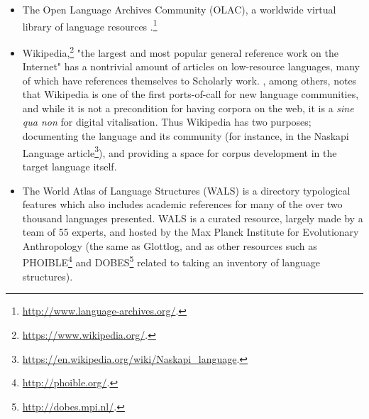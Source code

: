 \begin{itemize}
\item The Open Language Archives Community (OLAC), a worldwide virtual library of language resources \citep{simons2003open}.\footnote{\href{http://www.language-archives.org/}{http://www.language-archives.org/}. }

\item Wikipedia,\footnote{\href{https://www.wikipedia.org/}{https://www.wikipedia.org/}. } "the largest and most popular general reference work on the Internet" \citep{wiki:Wikipedia} has a nontrivial amount of articles on low-resource languages, many of which have references themselves to Scholarly work. \citet{kornai2013digital}, among others, notes that Wiki\-pedia is one of the first ports-of-call for new language communities, and while it is not a precondition for having corpora on the web, it is a {\it sine qua non} for digital vitalisation. Thus Wikipedia has two purposes; documenting the language and its community (for instance, in the Naskapi Language article\footnote{\href{https://en.wikipedia.org/wiki/Naskapi\_language}{https://en.wikipedia.org/wiki/Naskapi\_language}. }), and providing a space for corpus development in the target language itself.

\item The World Atlas of Language Structures (WALS) is a directory typological features which also includes academic references for many of the over two thousand languages presented. WALS is a curated resource, largely made by a team of 55 experts, and hosted by the Max Planck Institute for Evolutionary Anthropology (the same as Glottlog, and as other resources such as PHOIBLE\footnote{\href{http://phoible.org/}{http://phoible.org/}. } \citep{phoible} and DOBES\footnote{\href{http://dobes.mpi.nl/}{http://dobes.mpi.nl/}. } \citep{wittenburg2003dobes} related to taking an inventory of language structures). \citep{wals}



\end{itemize}

